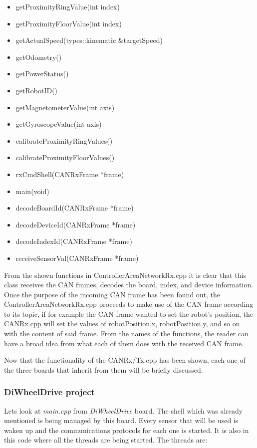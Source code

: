 \documentclass[12pt]{report}%
\begin{document}
\begin{itemize}
\item getProximityRingValue(int index)
\item getProximityFloorValue(int index)
\item getActualSpeed(types::kinematic \&targetSpeed)
\item getOdometry()
\item getPowerStatus()
\item getRobotID()
\item getMagnetometerValue(int axis)
\item getGyroscopeValue(int axis)
\item calibrateProximityRingValues()
\item calibrateProximityFloorValues()
\item rxCmdShell(CANRxFrame *frame)
\item main(void)
\item decodeBoardId(CANRxFrame *frame)
\item decodeDeviceId(CANRxFrame *frame)
\item decodeIndexId(CANRxFrame *frame)
\item receiveSensorVal(CANRxFrame *frame)
\end{itemize}

From the shown functions in ControllerAreaNetworkRx.cpp it is clear that this class receives the CAN frames, decodes the board, index, and device information. Once the purpose of the incoming CAN frame has been found out, the ControllerAreaNetworkRx.cpp proceeds to make use of the CAN frame according to its topic, if for example the CAN frame wanted to set the robot's position, the CANRx.cpp will set the values of robotPosition.x, robotPosition.y, and so on with the content of said frame. From the names of the functions, the reader can have a broad idea from what each of them does with the received CAN frame.

Now that the functionality of the CANRx/Tx.cpp has been shown, each one of the three boards that inherit from them will be briefly discussed.

\subsubsection{DiWheelDrive project}
Lets look at \textit{main.cpp} from \textit{DiWheelDrive} board. The shell which was already mentioned is being managed by this board. Every sensor that will be used is waken up and the communications protocols for each one is started. It is also in this code where all the threads are being started. The threads are:
\end{document}
